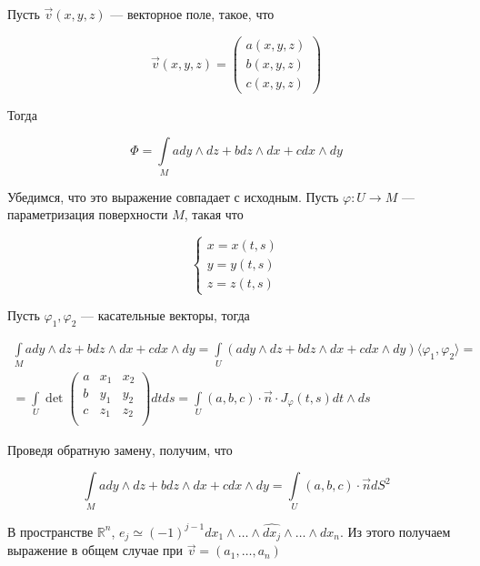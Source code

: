 \documentclass[a5paper]{article}
\theoremstyle{plain}
\theoremstyle{definition}
\numberwithin{through}{section}
\numberwithin{equation}{section}
\begin{document}
Пусть $\vec{v}(x, y, z)$ --- векторное поле, такое, что

\begin{equation*}
	\vec{v}(x, y, z) = 
	\begin{pmatrix}
		a(x, y, z) \\
		b(x, y, z) \\ 
		c(x, y, z)
	\end{pmatrix}
\end{equation*}

Тогда

\begin{equation*}
	\Phi = \int\limits_{M} ady \wedge dz + b dz \wedge dx + c dx \wedge dy
\end{equation*}

Убедимся, что это выражение совпадает с исходным. Пусть $\varphi: U \to M$ --- параметризация поверхности $M$, такая что

\begin{equation*}
	\begin{cases}
		x = x(t, s) \\
		y = y(t, s) \\
		z = z(t, s)
	\end{cases}
\end{equation*} 

Пусть $\varphi_1, \varphi_2$ --- касательные векторы, тогда

\begin{align*}
	\int\limits_{M} ady \wedge dz + b dz \wedge dx + c dx \wedge dy = \int\limits_{U} (ady \wedge dz + b dz \wedge dx + c dx \wedge dy) \langle \varphi_1, \varphi_2 \rangle = \\ = \int\limits_{U} \det 
	\begin{pmatrix}
		a & x_1 & x_2 \\
		b & y_1 & y_2 \\
		c & z_1 & z_2 \\
	\end{pmatrix} dtds = \int\limits_{U} (a, b, c) \cdot \vec{n} \cdot J_{\varphi}(t, s) dt \wedge ds
\end{align*}

Проведя обратную замену, получим, что

\begin{equation*}
	\int\limits_{M} ady \wedge dz + b dz \wedge dx + c dx \wedge dy = \int\limits_{U} (a, b, c) \cdot \vec{n} d S^2
\end{equation*}

В пространстве $\mathbb{R}^n$, $e_j \simeq (-1)^{j-1} dx_1 \wedge \ldots \wedge \widehat{dx_j} \wedge \ldots \wedge dx_n$. Из этого получаем выражение в общем случае при $\vec{v}=(a_1, \ldots, a_n)$
\end{document}
